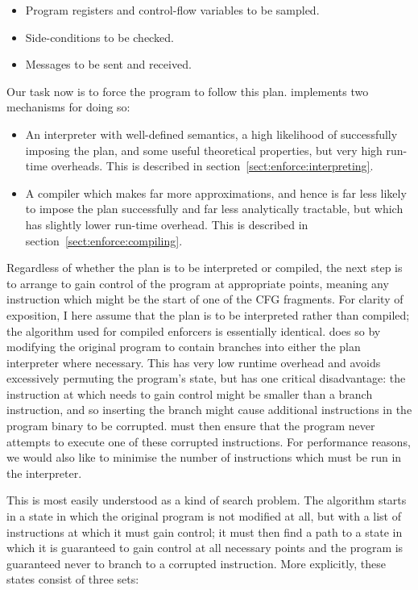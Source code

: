 \begin{itemize}
\item Program registers and control-flow variables to be sampled.
\item Side-conditions to be checked.
\item Messages to be sent and received.
\end{itemize}

Our task now is to force the program to follow this plan.
{\Implementation} implements two mechanisms for doing so:

\begin{itemize}
\item
  An interpreter with well-defined semantics, a high likelihood of
  successfully imposing the plan, and some useful theoretical
  properties, but very high run-time overheads.  This is described in
  section~\ref{sect:enforce:interpreting}.
\item
  A compiler which makes far more approximations, and hence is far
  less likely to impose the plan successfully and far less
  analytically tractable, but which has slightly lower run-time
  overhead.  This is described in section~\ref{sect:enforce:compiling}.
\end{itemize}

\label{sect:enforce:assign_entry_points}
Regardless of whether the plan is to be interpreted or compiled, the
next step is to arrange to gain control of the program at appropriate
points, meaning any instruction which might be the start of one of the
CFG fragments.  For clarity of exposition, I here assume that the plan
is to be interpreted rather than compiled; the algorithm used for
compiled enforcers is essentially identical. {\Implementation} does so
by modifying the original program to contain branches into either the
plan interpreter where necessary.  This has very low runtime overhead
and avoids excessively permuting the program's state, but has one
critical disadvantage: the instruction at which {\implementation}
needs to gain control might be smaller than a branch instruction, and
so inserting the branch might cause additional instructions in the
program binary to be corrupted.  {\Implementation} must then ensure
that the program never attempts to execute one of these corrupted
instructions.  For performance reasons, we would also like to minimise
the number of instructions which must be run in the interpreter.

This is most easily understood as a kind of search problem.  The
algorithm starts in a state in which the original program is not
modified at all, but with a list of instructions at which it must gain
control; it must then find a path to a state in which it is guaranteed
to gain control at all necessary points and the program is guaranteed
never to branch to a corrupted instruction.  More explicitly, these
states consist of three sets:

